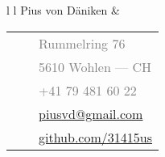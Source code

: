 \documentclass[10pt, a4paper]{article}
\begin{document}
\pagestyle{empty}

\begin{tabular}{l l}
    \textcolor{Mahogany}{{\Huge Pius von D\"aniken}} &
        \begin{tabular}{c r l}
            & \textcolor{Gray}{\faHome{}} & \textcolor{Gray}{Rummelring 76} \\
            & & \textcolor{Gray}{5610 Wohlen --- CH} \\
            & \textcolor{Gray}{\faMobile{}} & \textcolor{Gray}{+41 79 481 60 22} \\
            & \textcolor{Gray}{\faEnvelope{}} & \textcolor{Gray}{\href{mailto:piusv@gmail.com}{piusvd@gmail.com}} \\
            & \textcolor{Gray}{\faGithub{}} & \textcolor{Gray}{\href{https://www.github.com/31415us}{github.com/31415us}} \\
        \end{tabular} \\
\end{tabular}
\end{document}
